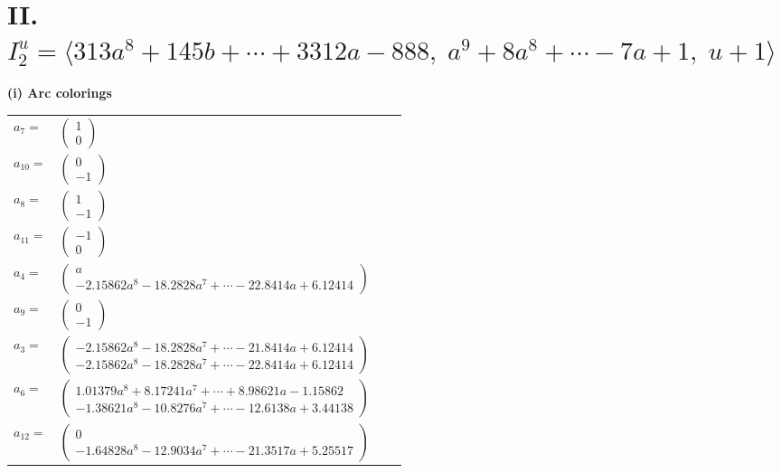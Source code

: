 \documentclass[1p]{elsarticle_modified}
\theoremstyle{definition}
\begin{document}
\centering \section*{II. $I^u_{2}= \langle 313 a^8+145 b+\cdots+3312 a-888,\;a^9+8 a^8+\cdots-7 a+1,\;u+1 \rangle$}
\flushleft \textbf{(i) Arc colorings}\\
\begin{tabular}{m{7pt} m{180pt} m{7pt} m{180pt} }
\flushright $a_{7}=$&$\begin{pmatrix}1\\0\end{pmatrix}$ \\
\flushright $a_{10}=$&$\begin{pmatrix}0\\-1\end{pmatrix}$ \\
\flushright $a_{8}=$&$\begin{pmatrix}1\\-1\end{pmatrix}$ \\
\flushright $a_{11}=$&$\begin{pmatrix}-1\\0\end{pmatrix}$ \\
\flushright $a_{4}=$&$\begin{pmatrix}a\\-2.15862 a^{8}-18.2828 a^{7}+\cdots-22.8414 a+6.12414\end{pmatrix}$ \\
\flushright $a_{9}=$&$\begin{pmatrix}0\\-1\end{pmatrix}$ \\
\flushright $a_{3}=$&$\begin{pmatrix}-2.15862 a^{8}-18.2828 a^{7}+\cdots-21.8414 a+6.12414\\-2.15862 a^{8}-18.2828 a^{7}+\cdots-22.8414 a+6.12414\end{pmatrix}$ \\
\flushright $a_{6}=$&$\begin{pmatrix}1.01379 a^{8}+8.17241 a^{7}+\cdots+8.98621 a-1.15862\\-1.38621 a^{8}-10.8276 a^{7}+\cdots-12.6138 a+3.44138\end{pmatrix}$ \\
\flushright $a_{12}=$&$\begin{pmatrix}0\\-1.64828 a^{8}-12.9034 a^{7}+\cdots-21.3517 a+5.25517\end{pmatrix}$ \\

\end{tabular}
\end{document}
